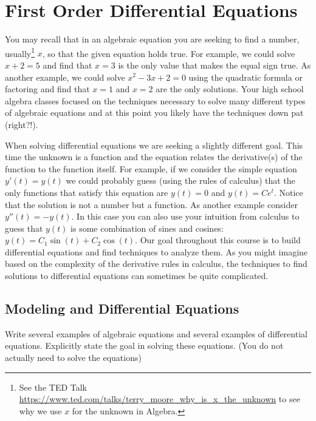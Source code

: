 \chapter{First Order Differential Equations}
You may recall that in an algebraic equation you are seeking to find a number,
usually\footnote{See the TED Talk
    \href{https://www.ted.com/talks/terry_moore_why_is_x_the_unknown}{https://www.ted.com/talks/terry\_moore\_why\_is\_x\_the\_unknown}
to see why we use $x$ for the unknown in Algebra.}
$x$, so that the given equation holds true.  For example, we could solve $x+2 = 5$ and
find that $x=3$ is the only value that makes the equal sign true.  As another example, we
could solve $x^2-3x+2 = 0$ using the quadratic formula or factoring and find that $x=1$
and $x=2$ are the only solutions. Your high school algebra classes focused on the
techniques necessary to solve many different types of algebraic equations and at this
point you likely have the techniques down pat (right?!).

When solving differential equations we are seeking a slightly different goal.  This time
the unknown is a function and the equation relates the derivative(s) of the function to
the function itself.  For example, if we consider the simple equation $y'(t) = y(t)$ we could
probably guess (using the rules of calculus) that the only functions that satisfy this
equation are $y(t) = 0$ and $y(t) = Ce^t$.  Notice that the solution is not a number but a
function.  As another example consider $y''(t) = -y(t)$.  In this case you can also use
your intuition from calculus to guess that $y(t)$ is some combination of sines and
cosines: $y(t) = C_1 \sin(t) + C_2 \cos(t)$. Our goal throughout this course is to build
differential equations and find techniques to analyze them. As you might imagine based on
the complexity of the derivative rules in calculus, the techniques to find solutions to
differential equations can sometimes be quite complicated.

\newpage \section{Modeling and Differential Equations}

\begin{problem}
    Write several examples of algebraic equations and several examples of differential
    equations.  Explicitly state the goal in solving these equations.  (You do not
    actually need to solve the equations)
\end{problem}


